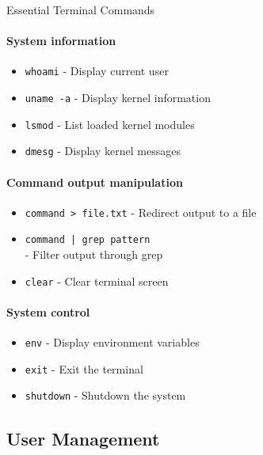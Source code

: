 \begin{KR}{Essential Terminal Commands}
    \paragraph{System information}
    \begin{itemize}
        \item \texttt{whoami} - Display current user
        \item \texttt{uname -a} - Display kernel information
        \item \texttt{lsmod} - List loaded kernel modules
        \item \texttt{dmesg} - Display kernel messages
    \end{itemize}
    
    \paragraph{Command output manipulation}
    \begin{itemize}
        \item \texttt{command > file.txt} - Redirect output to a file
        \item \texttt{command | grep pattern} \\ - Filter output through grep
        \item \texttt{clear} - Clear terminal screen
    \end{itemize}
    
    \paragraph{System control}
    \begin{itemize}
        \item \texttt{env} - Display environment variables
        \item \texttt{exit} - Exit the terminal
        \item \texttt{shutdown} - Shutdown the system
    \end{itemize}
\end{KR}

\multend


\subsection{User Management}


